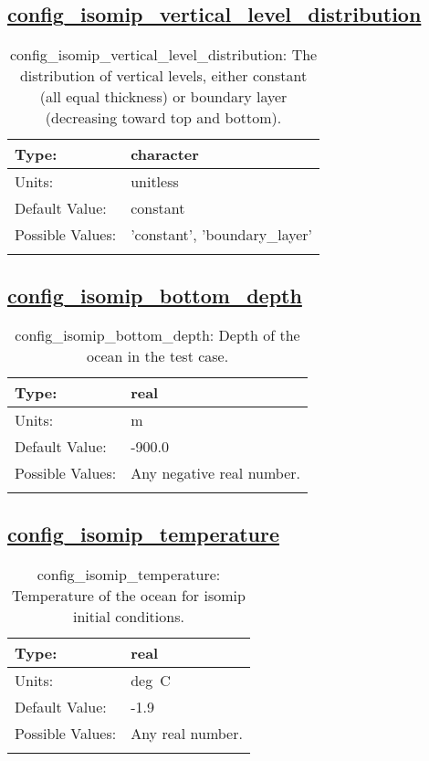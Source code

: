 \subsection[config\_isomip\_vertical\_level\_distribution]{\hyperref[sec:nm_tab_isomip]{config\_isomip\_vertical\_level\_distribution}}
\label{subsec:nm_sec_config_isomip_vertical_level_distribution}
\begin{center}
\begin{longtable}{| p{2.0in} || p{4.0in} |}
    \hline
    Type: & character \\
    \hline
    Units: & \si{unitless} \\
    \hline
    Default Value: & constant \\
    \hline
    Possible Values: & 'constant', 'boundary\_layer' \\
    \hline
    \caption{config\_isomip\_vertical\_level\_distribution: The distribution of vertical levels, either constant (all equal thickness) or boundary layer (decreasing toward top and bottom).}
\end{longtable}
\end{center}
\subsection[config\_isomip\_bottom\_depth]{\hyperref[sec:nm_tab_isomip]{config\_isomip\_bottom\_depth}}
\label{subsec:nm_sec_config_isomip_bottom_depth}
\begin{center}
\begin{longtable}{| p{2.0in} || p{4.0in} |}
    \hline
    Type: & real \\
    \hline
    Units: & \si{m} \\
    \hline
    Default Value: & -900.0 \\
    \hline
    Possible Values: & Any negative real number. \\
    \hline
    \caption{config\_isomip\_bottom\_depth: Depth of the ocean in the test case.}
\end{longtable}
\end{center}
\subsection[config\_isomip\_temperature]{\hyperref[sec:nm_tab_isomip]{config\_isomip\_temperature}}
\label{subsec:nm_sec_config_isomip_temperature}
\begin{center}
\begin{longtable}{| p{2.0in} || p{4.0in} |}
    \hline
    Type: & real \\
    \hline
    Units: & \si{deg.C} \\
    \hline
    Default Value: & -1.9 \\
    \hline
    Possible Values: & Any real number. \\
    \hline
    \caption{config\_isomip\_temperature: Temperature of the ocean for isomip initial conditions.}
\end{longtable}
\end{center}
